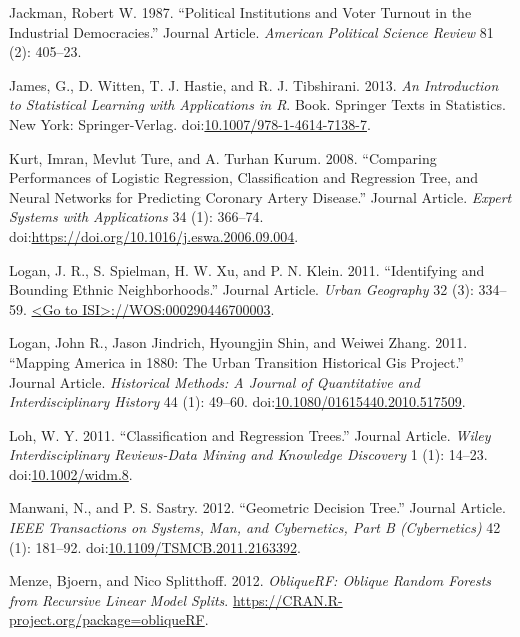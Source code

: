 \documentclass[]{elsarticle} %
\begin{document}
\hypertarget{ref-Jackman1987}{}
Jackman, Robert W. 1987. ``Political Institutions and Voter Turnout in
the Industrial Democracies.'' Journal Article. \emph{American Political
Science Review} 81 (2): 405--23.

\hypertarget{ref-James2013}{}
James, G., D. Witten, T. J. Hastie, and R. J. Tibshirani. 2013. \emph{An
Introduction to Statistical Learning with Applications in R}. Book.
Springer Texts in Statistics. New York: Springer-Verlag.
doi:\href{https://doi.org/10.1007/978-1-4614-7138-7}{10.1007/978-1-4614-7138-7}.

\hypertarget{ref-Kurt2008}{}
Kurt, Imran, Mevlut Ture, and A. Turhan Kurum. 2008. ``Comparing
Performances of Logistic Regression, Classification and Regression Tree,
and Neural Networks for Predicting Coronary Artery Disease.'' Journal
Article. \emph{Expert Systems with Applications} 34 (1): 366--74.
doi:\href{https://doi.org/https://doi.org/10.1016/j.eswa.2006.09.004}{https://doi.org/10.1016/j.eswa.2006.09.004}.

\hypertarget{ref-Logan2011}{}
Logan, J. R., S. Spielman, H. W. Xu, and P. N. Klein. 2011.
``Identifying and Bounding Ethnic Neighborhoods.'' Journal Article.
\emph{Urban Geography} 32 (3): 334--59.
\href{\%3CGo\%20to\%20ISI\%3E://WOS:000290446700003}{\textless{}Go to ISI\textgreater{}://WOS:000290446700003}.

\hypertarget{ref-Logan2011urbanhistorical}{}
Logan, John R., Jason Jindrich, Hyoungjin Shin, and Weiwei Zhang. 2011.
``Mapping America in 1880: The Urban Transition Historical Gis
Project.'' Journal Article. \emph{Historical Methods: A Journal of
Quantitative and Interdisciplinary History} 44 (1): 49--60.
doi:\href{https://doi.org/10.1080/01615440.2010.517509}{10.1080/01615440.2010.517509}.

\hypertarget{ref-Loh2011}{}
Loh, W. Y. 2011. ``Classification and Regression Trees.'' Journal
Article. \emph{Wiley Interdisciplinary Reviews-Data Mining and Knowledge
Discovery} 1 (1): 14--23.
doi:\href{https://doi.org/10.1002/widm.8}{10.1002/widm.8}.

\hypertarget{ref-Manwani2012}{}
Manwani, N., and P. S. Sastry. 2012. ``Geometric Decision Tree.''
Journal Article. \emph{IEEE Transactions on Systems, Man, and
Cybernetics, Part B (Cybernetics)} 42 (1): 181--92.
doi:\href{https://doi.org/10.1109/TSMCB.2011.2163392}{10.1109/TSMCB.2011.2163392}.

\hypertarget{ref-Menze2012}{}
Menze, Bjoern, and Nico Splitthoff. 2012. \emph{ObliqueRF: Oblique
Random Forests from Recursive Linear Model Splits}.
\url{https://CRAN.R-project.org/package=obliqueRF}.
\end{document}
